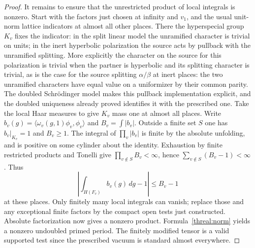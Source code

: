 \begin{proof}
It remains to ensure that the unrestricted product of local
integrals is nonzero. Start with the factors just chosen at infinity
and \(v_1\), and the usual unit-norm lattice indicators at almost
all other places. There the hyperspecial group \(K_v\) fixes the
indicator: in the split linear model the unramified character is
trivial on units; in the inert hyperbolic polarization the source
acts by pullback with the unramified splitting. More explicitly the
character on the source for this polarization is trivial when the
partner is hyperbolic and its splitting character is trivial, as
is the case for the source splitting \(\alpha/\beta\) at inert places:
the two unramified characters have equal value on a uniformizer
by their common parity. The doubled Schr\"odinger model makes this
pullback implementation explicit, and the doubled uniqueness already
proved identifies it with the prescribed one. Take the local Haar
measures to give \(K_v\) mass one at almost all places. Write
\(b_v(g)=\langle\omega_v(g,1)\phi_v,\phi_v\rangle\) and
\(B_v=\int|b_v|\). Outside a finite set \(S\) one has \(b_v|_{K_v}=1\)
and \(B_v\ge1\). The integral of \(\prod_v|b_v|\) is finite by
the absolute unfolding, and is positive on some cylinder about
the identity. Exhaustion by finite restricted products and Tonelli
give \(\prod_{v\notin S} B_v<\infty\), hence
\(\sum_{v\notin S}(B_v-1)<\infty\). Thus
\[
        \left|\int_{H(F_v)} b_v(g)\,dg-1\right|
              \le B_v-1
\]
at these places. Only finitely many local integrals can vanish;
replace those and any exceptional finite factors by the compact
open tests just constructed. Absolute factorization now gives a
nonzero product. Formula~\eqref{threal:norm} yields a nonzero
undoubled primed period. The finitely modified tensor is a valid
supported test since the prescribed vacuum is standard almost
everywhere.
\end{proof}

